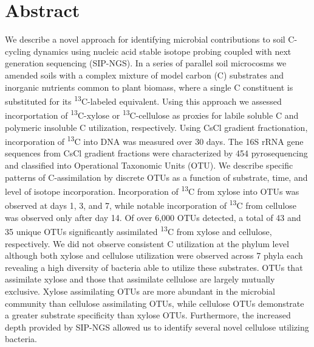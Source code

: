 \section{Abstract} 
We describe a novel approach for identifying microbial contributions to soil C-cycling dynamics using nucleic acid stable isotope probing coupled with next generation sequencing (SIP-NGS). In a series of parallel soil microcosms we amended soils with a complex mixture of model carbon (C) substrates and inorganic nutrients common to plant biomass, where a single C constituent is substituted for its \textsuperscript{13}C-labeled equivalent. Using this approach we assessed incorportation of \textsuperscript{13}C-xylose or \textsuperscript{13}C-cellulose as proxies for labile soluble C and polymeric insoluble C utilization, respectively. Using CsCl gradient fractionation, incorporation of \textsuperscript{13}C into DNA was measured over 30 days. The 16S rRNA gene sequences from CsCl gradient fractions were characterized by 454 pyrosequencing and classified into Operational Taxonomic Units (OTU). We describe specific patterns of C-assimilation by discrete OTUs as a function of substrate, time, and level of isotope incorporation. Incorporation of \textsuperscript{13}C from xylose into OTUs was observed at days 1, 3, and 7, while notable incorporation of \textsuperscript{13}C from cellulose was observed only after day 14. Of over 6,000 OTUs detected, a total of 43 and 35 unique OTUs significantly assimilated \textsuperscript{13}C from xylose and cellulose, respectively. We did not observe consistent C utilization at the phylum level although both xylose and cellulose utilization were observed across 7 phyla each revealing a high diversity of bacteria able to utilize these substrates. OTUs that assimilate xylose and those that assimilate cellulose are largely mutually exclusive. Xylose assimilating OTUs are more abundant in the microbial community than cellulose assimilating OTUs, while cellulose OTUs demonstrate a greater substrate specificity than xylose OTUs. Furthermore, the increased depth provided by SIP-NGS allowed us to identify several novel cellulose utilizing bacteria.        

